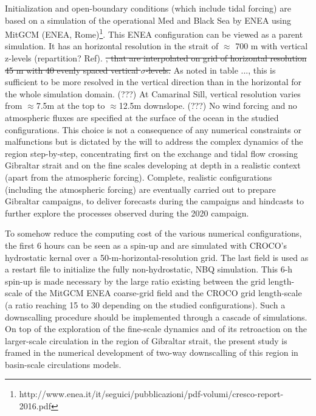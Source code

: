 Initialization and open-boundary conditions (which include tidal forcing) are based on a simulation of the operational Med and Black Sea by ENEA using MitGCM (ENEA, Rome)\footnote{http://www.enea.it/it/seguici/pubblicazioni/pdf-volumi/cresco-report-2016.pdf}. This ENEA configuration can be viewed as a parent simulation. \color{black} It has an horizontal resolution in the strait of $\approx$ 700 m with vertical z-levels (repartition? Ref). \sout{, that are interpolated on grid of horizontal resolution 45 m with 40 evenly spaced vertical $\sigma$-levels.} \color{black} As noted in table ..., this is sufficient to be more resolved in the vertical direction than in the horizontal for the whole simulation domain. \color{blue}(???) \color{black} At Camarinal Sill, vertical resolution varies from $\approx$7.5m at the top to $\approx$12.5m downslope. \color{blue}(???) No wind forcing and no atmospheric fluxes are specified at the surface of the ocean in the studied configurations. This choice is not a consequence of any numerical constraints or malfunctions but is dictated by the will to address the complex dynamics of the region step-by-step, concentrating first on the exchange and tidal flow crossing Gibraltar strait and on the fine scales developing at depth in a realistic context (apart from the atmospheric forcing). Complete, realistic configurations (including the atmospheric forcing) are eventually carried out to prepare Gibraltar campaigns, to deliver forecasts during the campaigns and hindcasts to further explore the processes observed during the 2020 campaign.\color{black}

\color{blue}To somehow reduce the computing cost of the various numerical configurations, the first 6 hours can be seen as a spin-up and are simulated with CROCO's hydrostatic kernal over a 50-m-horizontal-resolution grid. The last field is used as a restart file to initialize the fully non-hydrostatic, NBQ simulation. This 6-h spin-up is made necessary by the large ratio existing between the grid length-scale of the MitGCM ENEA coarse-grid field and the CROCO grid length-scale (a ratio reaching 15 to 30 depending on the studied configurations). Such a downscalling procedure should be implemented through a cascade of simulations. On top of the exploration of the fine-scale dynamics and of its retroaction on the larger-scale circulation in the region of Gibraltar strait, the present study is framed in the numerical development of two-way downscalling of this region in basin-scale circulations models.\color{black}

